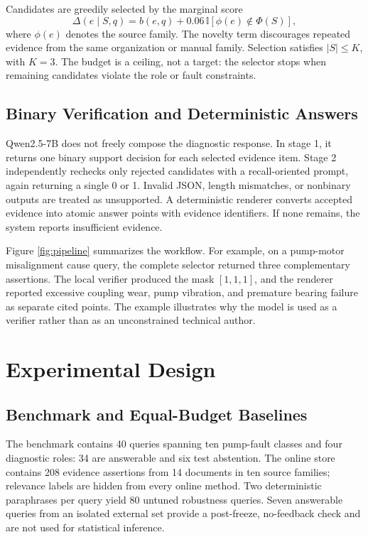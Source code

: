 \documentclass[conference]{IEEEtran}
\begin{document}
Candidates are greedily selected by the marginal score
\begin{equation}
\Delta(e\mid S,q)=b(e,q)+0.06\,\mathbb{I}[\phi(e)\notin\Phi(S)],
\label{eq:select}
\end{equation}
where $\phi(e)$ denotes the source family. The novelty term discourages repeated evidence from the same organization or manual family. Selection satisfies $|S|\leq K$, with $K=3$. The budget is a ceiling, not a target: the selector stops when remaining candidates violate the role or fault constraints.

\subsection{Binary Verification and Deterministic Answers}

Qwen2.5-7B does not freely compose the diagnostic response. In stage 1, it returns one binary support decision for each selected evidence item. Stage 2 independently rechecks only rejected candidates with a recall-oriented prompt, again returning a single 0 or 1. Invalid JSON, length mismatches, or nonbinary outputs are treated as unsupported. A deterministic renderer converts accepted evidence into atomic answer points with evidence identifiers. If none remains, the system reports insufficient evidence.

Figure \ref{fig:pipeline} summarizes the workflow. For example, on a pump-motor misalignment cause query, the complete selector returned three complementary assertions. The local verifier produced the mask $[1,1,1]$, and the renderer reported excessive coupling wear, pump vibration, and premature bearing failure as separate cited points. The example illustrates why the model is used as a verifier rather than as an unconstrained technical author.

\section{Experimental Design}

\subsection{Benchmark and Equal-Budget Baselines}

The benchmark contains 40 queries spanning ten pump-fault classes and four diagnostic roles: 34 are answerable and six test abstention. The online store contains 208 evidence assertions from 14 documents in ten source families; relevance labels are hidden from every online method. Two deterministic paraphrases per query yield 80 untuned robustness queries. Seven answerable queries from an isolated external set provide a post-freeze, no-feedback check and are not used for statistical inference.
\end{document}

